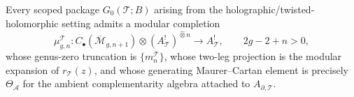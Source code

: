 \begin{conjecture}
\ClaimStatusConjectured
Every scoped package $G_0(\mathcal{T}; B)$ arising from the
holographic/twisted-holomorphic setting admits a modular completion
\[
\mu^{\mathcal{T}}_{g,n} \colon
C_\bullet(\overline{\mathcal{M}}_{g,n+1})
\otimes (A^!_{\mathcal{T}})^{\widehat\otimes n}
\to A^!_{\mathcal{T}},
\qquad 2g - 2 + n > 0,
\]
whose genus-zero truncation is $\{m_n^{\mathcal{T}}\}$, whose
two-leg projection is the modular expansion of
$r_{\mathcal{T}}(z)$, and whose generating Maurer--Cartan element
is precisely $\Theta_{\mathcal{A}}$ for the ambient
complementarity algebra attached to $A_{\partial,\mathcal{T}}$.
\end{conjecture}

